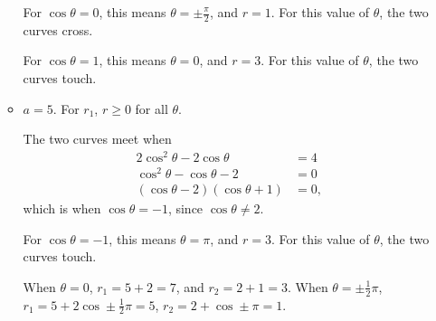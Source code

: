 \begin{enumerate}
\begin{itemize}
                    For \(\cos \theta = 0\), this means \(\theta = \pm \frac{\pi}{2}\), and \(r = 1\). For this value of \(\theta\), the two curves cross.

                    For \(\cos \theta = 1\), this means \(\theta = 0\), and \(r = 3\). For this value of \(\theta\), the two curves touch.

                    \begin{center}
                        
                    \end{center}

              \item \(a = 5\). For \(r_1\), \(r \geq 0\) for all \(\theta\).

                    The two curves meet when
                    \begin{align*}
                        2 \cos^2 \theta - 2 \cos \theta     & = 4  \\
                        \cos^2 \theta - \cos \theta - 2     & = 0  \\
                        (\cos \theta - 2) (\cos \theta + 1) & = 0,
                    \end{align*}
                    which is when \(\cos \theta = -1\), since \(\cos \theta \neq 2\).

                    For \(\cos \theta = -1\), this means \(\theta = \pi\), and \(r = 3\). For this value of \(\theta\), the two curves touch.

                    When \(\theta = 0\), \(r_1 = 5 + 2 = 7\), and \(r_2 = 2 + 1 = 3\). When \(\theta = \pm \frac{1}{2}\pi\), \(r_1 = 5 + 2 \cos \pm \frac{1}{2}\pi = 5\), \(r_2 = 2 + \cos \pm \pi = 1\).

                    \begin{center}
                        
                    \end{center}
          \end{itemize}
\end{enumerate}